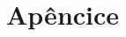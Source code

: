 \documentclass[11pt,fleqn]{book} %
\begin{document}

%


\chapter{Apêncice}\label{apendice}
\vspace{6em}
\begin{flushright}
	\textit{\textcolor{white}{}}
\end{flushright}
\vspace{12em}
\end{document}
